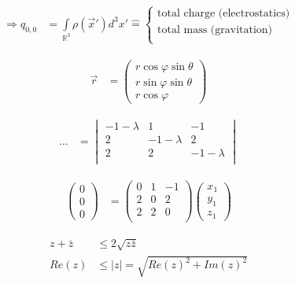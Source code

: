 \documentclass[12pt, a4paper, twopage]{scrartcl}
\newcommand{\entspricht}{\mathrel{\widehat{=}}}
\begin{document}
\begin{align}
	 \nonumber
	 \Rightarrow q_{0, 0} &= \int \limits_{\mathbb{R}^3} \rho(\vec{x}' ) d^3 x' \entspricht 
	 \begin{cases} 
	 \text{total charge (electrostatics)} \\
	 \text{total mass (gravitation)}\\
	 \end{cases}
\end{align}


\begin{align}
	 \vec{r} &= \left( \begin{matrix}
	 r \cos \varphi \sin \theta\\
	 r \sin \varphi \sin \theta\\
	 r \cos \varphi
	 \end{matrix} \right )
\end{align}


\begin{align}
	 ... &=\begin{vmatrix}
		  -1-\lambda & 1 & -1 \\
		  2 & -1-\lambda & 2\\
		  2 & 2 & -1-\lambda\\
		  \end{vmatrix}
\end{align}


\begin{align}
	 \begin{pmatrix}
	 0\\0\\0
	 \end{pmatrix} &= \begin{pmatrix}
	 0 & 1 & -1 \\
	 2 & 0 & 2\\
	 2 & 2 & 0\\
	 \end{pmatrix} \begin{pmatrix}
	 x_1 \\ y_1\\ z_1
	 \end{pmatrix}
\end{align}


\begin{align}
	 z + \bar{z} &\leq 2\sqrt{z\bar{z}} \tag*{:2} \\\nonumber	 
	 Re(z) &\leq |z| = \sqrt{Re(z)^2 + Im(z)^2} \tag*{$\square$}
\end{align}
\end{document}
